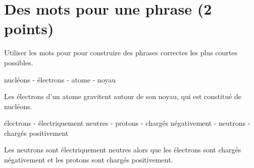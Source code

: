 \section{Des mots pour une phrase (2 points)}

Utiliser les mots pour pour construire des phrases correctes les plus courtes possibles.

\begin{questions}
	\question[1] nucléons - électrons - atome - noyau
	\fillwithdottedlines{1.5cm}
	\begin{solution}
		Les électrons d'un atome gravitent autour de son noyau, qui est constitué de nucléons.
	\end{solution}
	
	\question[1] électrons - électriquement neutres - protons - chargés négativement - neutrons - chargés positivement
	\fillwithdottedlines{2cm}
	\begin{solution}
		Les neutrons sont électriquement neutres alors que les électrons sont chargés négativement et les protons sont chargés positivement.
	\end{solution}
	
	
\end{questions}